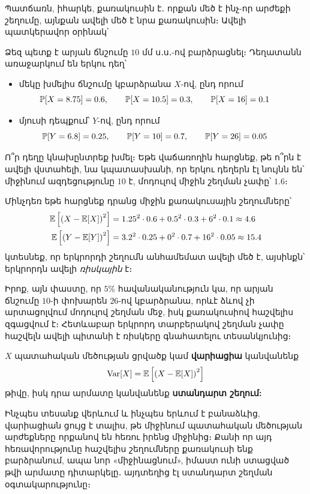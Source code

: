 Պատճառն, իհարկե, քառակուսին է․ որքան մեծ է ինչ-որ արժեքի շեղումը, այնքան ավելի մեծ է նրա քառակուսին։ Ավելի պատկերավոր օրինակ՝

\begin{example}
Ձեզ պետք է արյան ճնշումը $10$ մմ ս․ս․-ով բարձրացնել։ Դեղատանն առաջարկում են երկու դեղ՝
\begin{itemize}
\item մեկը խմելիս ճնշումը կբարձրանա $X$-ով, ընդ որում
\[
\hspace{-2em}\PP[X=8.75] = 0.6, \qquad \PP[X=10.5] = 0.3, \qquad \PP[X=16] = 0.1
\]
\item մյուսի դեպքում՝ $Y$-ով, ընդ որում
\[
\hspace{-2em}\PP[Y=6.8] = 0.25, \qquad \PP[Y=10] = 0.7, \qquad \PP[Y=26] = 0.05
\]
\end{itemize}
Ո՞ր դեղը կնախընտրեք խմել։
Եթե վաճառողին հարցնեք, թե ո՞րն է ավելի վստահելի, նա կպատասխանի, որ երկու դեղերն էլ նույնն են՝ միջինում ազդեցությունը $10$ է, մոդուլով միջին շեղման չափը՝ $1.6$։ 

Մինչդեռ եթե հարցնեք դրանց միջին քառակուսային շեղումները՝
\begin{align*}
\mathbb{E}\left[\left(X - \mathbb{E}[X]\right)^2\right] &= 1.25^2 \cdot 0.6 + 0.5^2 \cdot 0.3 + 6^2 \cdot 0.1 \approx 4.6\\
\mathbb{E}\left[\left(Y - \mathbb{E}[Y]\right)^2\right] &= 3.2^2 \cdot 0.25 + 0^2 \cdot 0.7 + 16^2 \cdot 0.05 \approx 15.4
\end{align*}
կտեսնեք, որ երկրորդի շեղումն անհամեմատ ավելի մեծ է, այսինքն՝ երկրորդն ավելի \textit{ռիսկային} է։
\end{example}

Իրոք, այն փաստը, որ $5\%$ հավանականություն կա, որ արյան ճնշումը $10$-ի փոխարեն $26$-ով կբարձրանա, որևէ ձևով չի արտացոլվում մոդուլով շեղման մեջ, իսկ քառակուսիով հաշվելիս զգացվում է։ Հետևաբար երկրորդ տարբերակով շեղման չափը հաշվելն ավելի պիտանի է ռիսկերը գնահատելու տեսանկյունից։ 

\begin{definition}
$X$ պատահական մեծության ցրվածք կամ \textbf{վարիացիա} կանվանենք 
\[
\operatorname{Var}[X] = \mathbb{E}\left[\left(X - \mathbb{E}[X]\right)^2\right] 
\]
թիվը, իսկ դրա արմատը կանվանենք \textbf{ստանդարտ շեղում:}
\end{definition}

Ինչպես տեսանք վերևում և ինչպես երևում է բանաձևից, վարիացիան ցույց է տալիս, թե միջինում պատահական մեծության արժեքները որքանով են հեռու իրենց միջինից։ Քանի որ այդ հեռավորությունը  հաշվելիս շեղումները քառակուսի ենք բարձրանում, ապա նոր «միջի\-նաց\-նում», իմաստ ունի ստացված թվի արմատը դիտարկելը․ այդտեղից էլ ստանդարտ շեղման օգտակարությունը։

